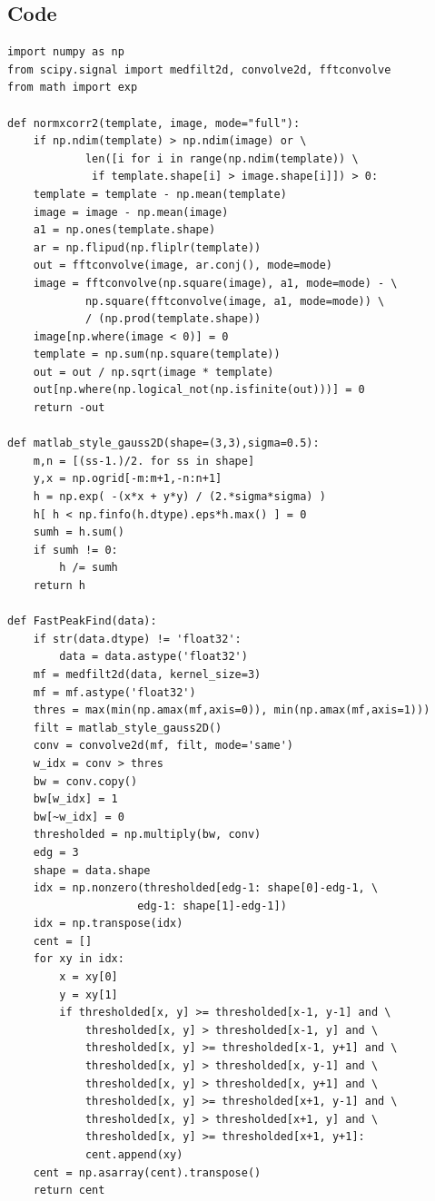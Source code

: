 \subsection{Code}
\begin{verbatim}
import numpy as np
from scipy.signal import medfilt2d, convolve2d, fftconvolve
from math import exp

def normxcorr2(template, image, mode="full"):
    if np.ndim(template) > np.ndim(image) or \
            len([i for i in range(np.ndim(template)) \
             if template.shape[i] > image.shape[i]]) > 0:
    template = template - np.mean(template)
    image = image - np.mean(image)
    a1 = np.ones(template.shape)
    ar = np.flipud(np.fliplr(template))
    out = fftconvolve(image, ar.conj(), mode=mode)
    image = fftconvolve(np.square(image), a1, mode=mode) - \
            np.square(fftconvolve(image, a1, mode=mode)) \
            / (np.prod(template.shape))
    image[np.where(image < 0)] = 0
    template = np.sum(np.square(template))
    out = out / np.sqrt(image * template)
    out[np.where(np.logical_not(np.isfinite(out)))] = 0
    return -out

def matlab_style_gauss2D(shape=(3,3),sigma=0.5):
    m,n = [(ss-1.)/2. for ss in shape]
    y,x = np.ogrid[-m:m+1,-n:n+1]
    h = np.exp( -(x*x + y*y) / (2.*sigma*sigma) )
    h[ h < np.finfo(h.dtype).eps*h.max() ] = 0
    sumh = h.sum()
    if sumh != 0:
        h /= sumh
    return h

def FastPeakFind(data):
    if str(data.dtype) != 'float32':
        data = data.astype('float32')
    mf = medfilt2d(data, kernel_size=3)
    mf = mf.astype('float32')
    thres = max(min(np.amax(mf,axis=0)), min(np.amax(mf,axis=1)))
    filt = matlab_style_gauss2D()
    conv = convolve2d(mf, filt, mode='same')
    w_idx = conv > thres
    bw = conv.copy()
    bw[w_idx] = 1
    bw[~w_idx] = 0
    thresholded = np.multiply(bw, conv)
    edg = 3
    shape = data.shape
    idx = np.nonzero(thresholded[edg-1: shape[0]-edg-1, \
                    edg-1: shape[1]-edg-1])
    idx = np.transpose(idx)
    cent = []
    for xy in idx:
        x = xy[0]
        y = xy[1]
        if thresholded[x, y] >= thresholded[x-1, y-1] and \
            thresholded[x, y] > thresholded[x-1, y] and \
            thresholded[x, y] >= thresholded[x-1, y+1] and \
            thresholded[x, y] > thresholded[x, y-1] and \
            thresholded[x, y] > thresholded[x, y+1] and \
            thresholded[x, y] >= thresholded[x+1, y-1] and \
            thresholded[x, y] > thresholded[x+1, y] and \
            thresholded[x, y] >= thresholded[x+1, y+1]:
            cent.append(xy)
    cent = np.asarray(cent).transpose()
    return cent


\end{verbatim}
